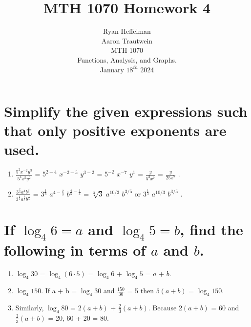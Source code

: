 \documentclass[16pt]{article}
\begin{document}
\Large
\date{}
\title{\LARGE MTH 1070 Homework 4}
\author{\LARGE Ryan Heffelman\\\LARGE Aaron Trautwein \\\LARGE 
MTH 1070 \\\LARGE Functions, Analysis, and Graphs. \\\LARGE January \(18^{th}\) 2024} 
\maketitle

\section{Simplify the given expressions such that only positive exponents are used.}
\LARGE
    \begin{enumerate} \begin{enumerate} \begin{enumerate}
    
    
        \item \(\frac{5^2 x^{-2} y^3}{5^4 x^5 y^2}\) = \(5^{2-4}\) \(x^{-2-5}\) \(y^{3-2}\) = \(5^{-2}\) \(x^{-7}\) \(y^1\) = \(\frac{y}{5^2 x^7}\) = \(\frac{y}{25 x^7}\) .

        \item \(\frac{3^{\frac{2}{3}} a^4 b^{\frac{4}{5}}}{3^{\frac{1}{3}} a^{\frac{2}{3}} b^{\frac{1}{5}}}\) =  \(3^{\frac{1}{3}}\) \(a^{4 - \frac{2}{3}}\) \(b^{\frac{4}{5} - \frac{1}{4}}\) = \(\sqrt[3]{3}\) \(a^{10/3}\) \(b^{3/5}\) or \(3^{\frac{1}{3}}\) \(a^{10/3}\) \(b^{3/5}\) . 
        
    \end{enumerate} \end{enumerate} \end{enumerate}
\section{If \(\log _{4} 6 = a\) and \(\log _{4} 5 = b\), find the following in terms of $a$ and $b$.}
    \begin{enumerate} \begin{enumerate} \begin{enumerate}
        \item \(\log _{4} 30\) = \(\log _{4}(6\cdot 5)\) = \(\log _{4} 6\) + \(\log _{4} 5\) = \(a\) + \(b\).
        \item \(\log _{4} 150\). If a + b = \(\log _{4} 30\) and \(\frac{150}{30}\) = 5 then \(5(a + b)\) = \(\log _{4} 150\).
        \item Similarly, \(\log _{4} 80\) = \(2(a + b)\) + \(\frac{2}{3}(a + b)\). Because \(2(a + b)\) = 60 and \(\frac{2}{3}(a + b)\) = 20, 60 + 20 = 80.
    \end{enumerate} \end{enumerate} \end{enumerate}
\end{document}
